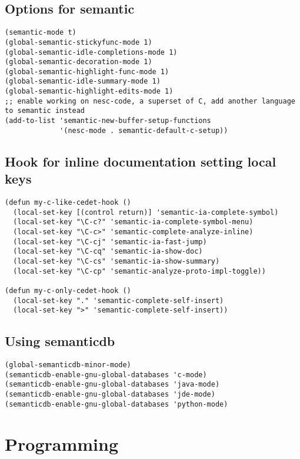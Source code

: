 \documentclass[11pt]{article}
\begin{document}
\subsection{Options for semantic}
\label{sec-30.2}

\begin{verbatim}
(semantic-mode t)
(global-semantic-stickyfunc-mode 1)
(global-semantic-idle-completions-mode 1)
(global-semantic-decoration-mode 1)
(global-semantic-highlight-func-mode 1)
(global-semantic-idle-summary-mode 1)
(global-semantic-highlight-edits-mode 1)
;; enable working on nesc-code, a superset of C, add another language to semantic instead
(add-to-list 'semantic-new-buffer-setup-functions
             '(nesc-mode . semantic-default-c-setup))
\end{verbatim}
\subsection{Hook for inline documentation setting local keys}
\label{sec-30.3}

\begin{verbatim}
(defun my-c-like-cedet-hook ()
  (local-set-key [(control return)] 'semantic-ia-complete-symbol)
  (local-set-key "\C-c?" 'semantic-ia-complete-symbol-menu)
  (local-set-key "\C-c>" 'semantic-complete-analyze-inline)
  (local-set-key "\C-cj" 'semantic-ia-fast-jump)
  (local-set-key "\C-cq" 'semantic-ia-show-doc)
  (local-set-key "\C-cs" 'semantic-ia-show-summary)
  (local-set-key "\C-cp" 'semantic-analyze-proto-impl-toggle))

(defun my-c-only-cedet-hook ()
  (local-set-key "." 'semantic-complete-self-insert)
  (local-set-key ">" 'semantic-complete-self-insert))
\end{verbatim}
\subsection{Using semanticdb}
\label{sec-30.4}

\begin{verbatim}
(global-semanticdb-minor-mode)
(semanticdb-enable-gnu-global-databases 'c-mode)
(semanticdb-enable-gnu-global-databases 'java-mode)
(semanticdb-enable-gnu-global-databases 'jde-mode)
(semanticdb-enable-gnu-global-databases 'python-mode)
\end{verbatim}

   
\section{Programming}
\label{sec-31}
\end{document}
